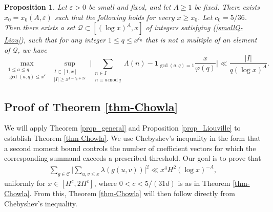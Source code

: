 \documentclass[reqno, 11pt]{amsart}
\renewcommand{\leq}{\leqslant}
\renewcommand{\geq}{\geqslant}
\newtheorem{Prop}[theorem]{Proposition}
\theoremstyle{definition}
\theoremstyle{definition}
\renewcommand{\geq}{\geqslant}
\renewcommand{\leq}{\leqslant}
\renewcommand{\mod}{\mathrm{mod}\,}
\newcommand{\eps}{\varepsilon}
\newcommand{\CCC}{\mathcal{C}}
\numberwithin{equation}{section}
\begin{document}
\begin{Prop}\label{prop_Lambda}
	Let $\eps > 0$ be small and fixed, and let $A \geq 1$ be fixed. There exists $x_0=x_0(A,\eps)$ such that the following holds for every $x \geq x_0$. Let $c_0 = 5/36$. Then there exists a set $\mathcal{Q} \subset [(\log x)^A, x]$ of integers satisfying (\ref{smallQ-Liou}), such that for any integer $1 \leq q \leq x^{c_0}$ that is not a multiple of an element of $\mathcal{Q}$, we have
	\begin{equation}
		\max_{\substack{1 \leq a \leq q \\ \gcd(a, q) \leq x^{\eps}}} \sup_{\substack{I \subset [1, x] \\ |I| \geq x^{1-c_0+2\eps} }} \Bigg| \sum_{\substack{n \in I \\ n \equiv a \, \mod q}} \Lambda(n) - \mathbf{1}_{\gcd(a,q) = 1} \frac{x}{\varphi(q)} \Bigg| \ll \frac{|I|}{q (\log x)^A}.
	\end{equation}
\end{Prop}
 
\subsection{Proof of Theorem \ref{thm-Chowla}}
We will apply Theorem \ref{prop_general} and Proposition \ref{prop_Liouville} to establish Theorem \ref{thm-Chowla}. We use Chebyshev's inequality in the form that a second moment bound controls the number of coefficient vectors for which the corresponding summand exceeds a prescribed threshold. Our goal is to prove that
\begin{eqnarray}\label{Liouville-1}
	\sum_{g \in \CCC} \Big| \sum_{u,v \leq x} \lambda (g(u,v)) \Big|^2 \ll x^4 H^2 (\log x)^{-A},
\end{eqnarray}
uniformly for $x \in [H^c, 2H^c]$, where $0<c<5/(31d)$ is as in Theorem \ref{thm-Chowla}. From this, Theorem \ref{thm-Chowla} will then follow directly from Chebyshev's inequality.
\end{document}
